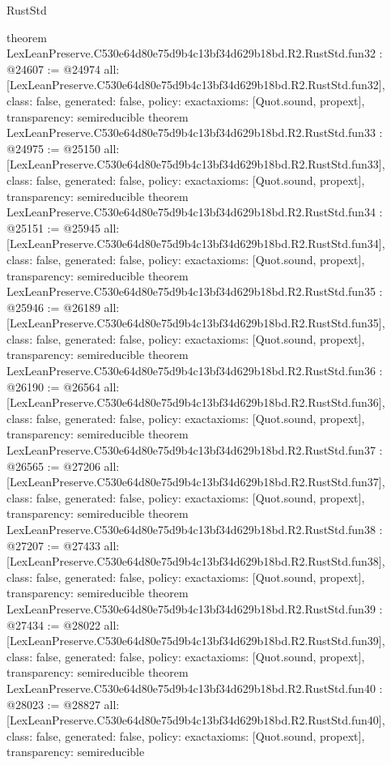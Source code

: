 \begin{lexlean}{RustStd}
\begin{coremodule}
{}
theorem LexLeanPreserve.C530e64d80e75d9b4c13bf34d629b18bd.R2.RustStd.fun32 : @24607 := @24974 {
  all: [LexLeanPreserve.C530e64d80e75d9b4c13bf34d629b18bd.R2.RustStd.fun32],
  class: false,
  generated: false,
  policy: exact{axioms: [Quot.sound, propext]},
  transparency: semireducible
}
theorem LexLeanPreserve.C530e64d80e75d9b4c13bf34d629b18bd.R2.RustStd.fun33 : @24975 := @25150 {
  all: [LexLeanPreserve.C530e64d80e75d9b4c13bf34d629b18bd.R2.RustStd.fun33],
  class: false,
  generated: false,
  policy: exact{axioms: [Quot.sound, propext]},
  transparency: semireducible
}
theorem LexLeanPreserve.C530e64d80e75d9b4c13bf34d629b18bd.R2.RustStd.fun34 : @25151 := @25945 {
  all: [LexLeanPreserve.C530e64d80e75d9b4c13bf34d629b18bd.R2.RustStd.fun34],
  class: false,
  generated: false,
  policy: exact{axioms: [Quot.sound, propext]},
  transparency: semireducible
}
theorem LexLeanPreserve.C530e64d80e75d9b4c13bf34d629b18bd.R2.RustStd.fun35 : @25946 := @26189 {
  all: [LexLeanPreserve.C530e64d80e75d9b4c13bf34d629b18bd.R2.RustStd.fun35],
  class: false,
  generated: false,
  policy: exact{axioms: [Quot.sound, propext]},
  transparency: semireducible
}
theorem LexLeanPreserve.C530e64d80e75d9b4c13bf34d629b18bd.R2.RustStd.fun36 : @26190 := @26564 {
  all: [LexLeanPreserve.C530e64d80e75d9b4c13bf34d629b18bd.R2.RustStd.fun36],
  class: false,
  generated: false,
  policy: exact{axioms: [Quot.sound, propext]},
  transparency: semireducible
}
theorem LexLeanPreserve.C530e64d80e75d9b4c13bf34d629b18bd.R2.RustStd.fun37 : @26565 := @27206 {
  all: [LexLeanPreserve.C530e64d80e75d9b4c13bf34d629b18bd.R2.RustStd.fun37],
  class: false,
  generated: false,
  policy: exact{axioms: [Quot.sound, propext]},
  transparency: semireducible
}
theorem LexLeanPreserve.C530e64d80e75d9b4c13bf34d629b18bd.R2.RustStd.fun38 : @27207 := @27433 {
  all: [LexLeanPreserve.C530e64d80e75d9b4c13bf34d629b18bd.R2.RustStd.fun38],
  class: false,
  generated: false,
  policy: exact{axioms: [Quot.sound, propext]},
  transparency: semireducible
}
theorem LexLeanPreserve.C530e64d80e75d9b4c13bf34d629b18bd.R2.RustStd.fun39 : @27434 := @28022 {
  all: [LexLeanPreserve.C530e64d80e75d9b4c13bf34d629b18bd.R2.RustStd.fun39],
  class: false,
  generated: false,
  policy: exact{axioms: [Quot.sound, propext]},
  transparency: semireducible
}
theorem LexLeanPreserve.C530e64d80e75d9b4c13bf34d629b18bd.R2.RustStd.fun40 : @28023 := @28827 {
  all: [LexLeanPreserve.C530e64d80e75d9b4c13bf34d629b18bd.R2.RustStd.fun40],
  class: false,
  generated: false,
  policy: exact{axioms: [Quot.sound, propext]},
  transparency: semireducible
}
\end{coremodule}
\end{lexlean}
